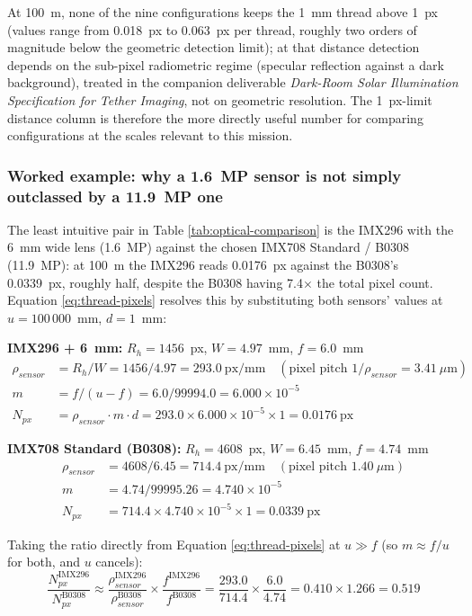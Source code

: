 At 100~m, none of the nine configurations keeps the 1~mm thread above 1~px (values range from 0.018~px to 0.063~px per thread, roughly two orders of magnitude below the geometric detection limit); at that distance detection depends on the sub-pixel radiometric regime (specular reflection against a dark background), treated in the companion deliverable \textit{Dark-Room Solar Illumination Specification for Tether Imaging}, not on geometric resolution. The 1~px-limit distance column is therefore the more directly useful number for comparing configurations at the scales relevant to this mission.

\subsubsection{Worked example: why a 1.6~MP sensor is not simply outclassed by a 11.9~MP one}
\label{sec:worked-example}

The least intuitive pair in Table \ref{tab:optical-comparison} is the IMX296 with the 6~mm wide lens (1.6~MP) against the chosen IMX708 Standard / B0308 (11.9~MP): at 100~m the IMX296 reads 0.0176~px against the B0308's 0.0339~px, roughly half, despite the B0308 having 7.4$\times$ the total pixel count. Equation \ref{eq:thread-pixels} resolves this by substituting both sensors' values at $u = 100\,000$~mm, $d = 1$~mm:

\textbf{IMX296 + 6~mm:} $R_h = 1456$~px, $W = 4.97$~mm, $f = 6.0$~mm
\begin{align*}
\rho_{sensor} &= R_h/W = 1456/4.97 = 293.0~\text{px/mm} \quad (\text{pixel pitch } 1/\rho_{sensor} = 3.41~\mu\text{m}) \\
m &= f/(u-f) = 6.0/99994.0 = 6.000\times10^{-5} \\
N_{px} &= \rho_{sensor} \cdot m \cdot d = 293.0 \times 6.000\times10^{-5} \times 1 = 0.0176~\text{px}
\end{align*}

\textbf{IMX708 Standard (B0308):} $R_h = 4608$~px, $W = 6.45$~mm, $f = 4.74$~mm
\begin{align*}
\rho_{sensor} &= 4608/6.45 = 714.4~\text{px/mm} \quad (\text{pixel pitch } 1.40~\mu\text{m}) \\
m &= 4.74/99995.26 = 4.740\times10^{-5} \\
N_{px} &= 714.4 \times 4.740\times10^{-5} \times 1 = 0.0339~\text{px}
\end{align*}

Taking the ratio directly from Equation \ref{eq:thread-pixels} at $u \gg f$ (so $m \approx f/u$ for both, and $u$ cancels):
\begin{equation*}
\frac{N_{px}^{\text{IMX296}}}{N_{px}^{\text{B0308}}} \approx \frac{\rho_{sensor}^{\text{IMX296}}}{\rho_{sensor}^{\text{B0308}}} \times \frac{f^{\text{IMX296}}}{f^{\text{B0308}}} = \frac{293.0}{714.4} \times \frac{6.0}{4.74} = 0.410 \times 1.266 = 0.519
\end{equation*}

